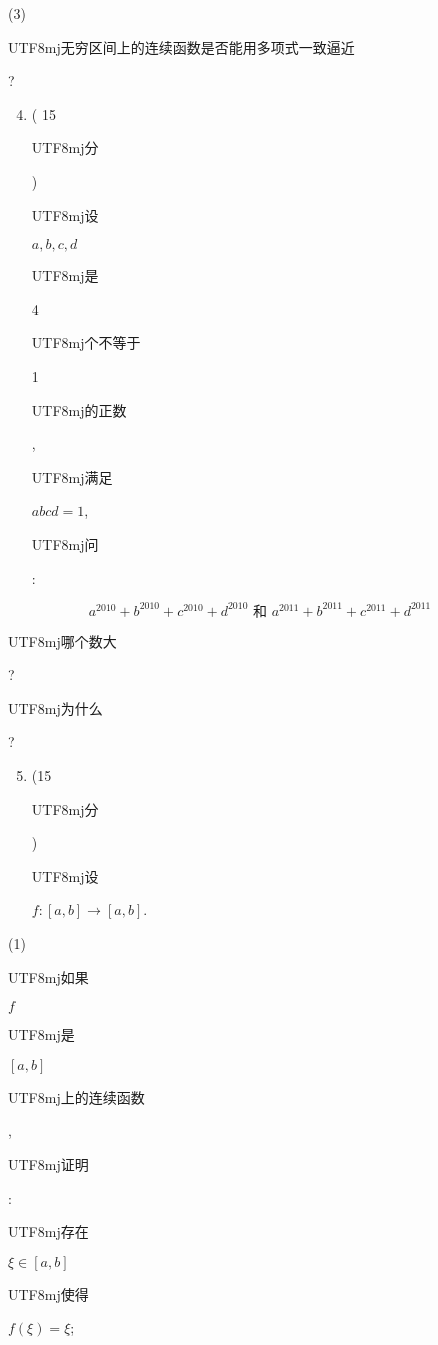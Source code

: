 \documentclass[10pt]{article}
\begin{document}
(3) \begin{CJK}{UTF8}{mj}无穷区间上的连续函数是否能用多项式一致逼近\end{CJK}?

\begin{enumerate}
  \setcounter{enumi}{3}
  \item ( 15 \begin{CJK}{UTF8}{mj}分\end{CJK}) \begin{CJK}{UTF8}{mj}设\end{CJK} $a, b, c, d$ \begin{CJK}{UTF8}{mj}是\end{CJK} 4 \begin{CJK}{UTF8}{mj}个不等于\end{CJK} 1 \begin{CJK}{UTF8}{mj}的正数\end{CJK}, \begin{CJK}{UTF8}{mj}满足\end{CJK} $a b c d=1$, \begin{CJK}{UTF8}{mj}问\end{CJK}:
\end{enumerate}
$$
a^{2010}+b^{2010}+c^{2010}+d^{2010} \text { 和 } a^{2011}+b^{2011}+c^{2011}+d^{2011}
$$
\begin{CJK}{UTF8}{mj}哪个数大\end{CJK}? \begin{CJK}{UTF8}{mj}为什么\end{CJK}?

\begin{enumerate}
  \setcounter{enumi}{4}
  \item (15 \begin{CJK}{UTF8}{mj}分\end{CJK}) \begin{CJK}{UTF8}{mj}设\end{CJK} $f:[a, b] \rightarrow[a, b]$.
\end{enumerate}
(1) \begin{CJK}{UTF8}{mj}如果\end{CJK} $f$ \begin{CJK}{UTF8}{mj}是\end{CJK} $[a, b]$ \begin{CJK}{UTF8}{mj}上的连续函数\end{CJK}, \begin{CJK}{UTF8}{mj}证明\end{CJK}: \begin{CJK}{UTF8}{mj}存在\end{CJK} $\xi \in[a, b]$ \begin{CJK}{UTF8}{mj}使得\end{CJK} $f(\xi)=\xi$;
\end{document}
